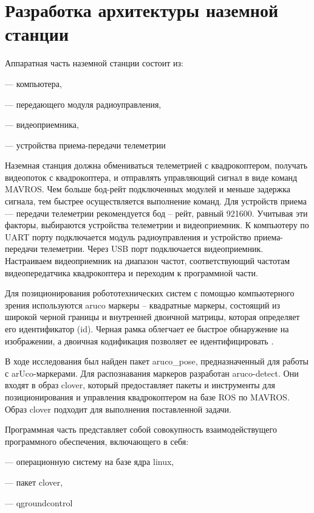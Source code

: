 
\section{Разработка архитектуры наземной станции}
Аппаратная часть наземной станции состоит из:

--- компьютера,

--- передающего модуля радиоуправления,

--- видеоприемника,

--- устройства приема-передачи телеметрии

Наземная станция должна обмениваться телеметрией с квадрокоптером, получать видеопоток с квадрокоптера, и отправлять управляющий сигнал в виде команд MAVROS. Чем больше бод-рейт подключенных модулей и меньше задержка сигнала, тем быстрее осуществляется выполнение команд. Для устройств приема --- передачи телеметрии рекомендуется бод -- рейт, равный 921600. Учитывая эти факторы, выбираются устройства телеметрии и видеоприемник.
К компьютеру по UART порту подключается модуль радиоуправления и устройство приема-передачи телеметрии. Через USB порт подключается видеоприемник. Настраиваем видеоприемник на диапазон частот, соответствующий частотам видеопередатчика квадрокоптера и переходим к программной части.

Для позиционирования робототехнических систем с помощью компьютерного зрения используются aruco маркеры -- квадратные маркеры, состоящий из широкой черной границы и внутренней двоичной матрицы, которая определяет его идентификатор (id). Черная рамка облегчает ее быстрое обнаружение на изображении, а двоичная кодификация позволяет ее идентифицировать \cite{opencv}.

В ходе исследования был найден пакет aruco\_pose, предназначенный для работы с arUco-маркерами. Для распознавания маркеров разработан aruco-detect. Они входят в образ clover, который предоставляет пакеты и инструменты для позиционирования и управления квадрокоптером на базе ROS по MAVROS. Образ clover подходит для выполнения поставленной задачи.

Программная часть представляет собой совокупность взаимодействущего программного обеспечения, включающего в себя:

--- операционную систему на базе ядра linux,

--- пакет clover,

--- qgroundcontrol

